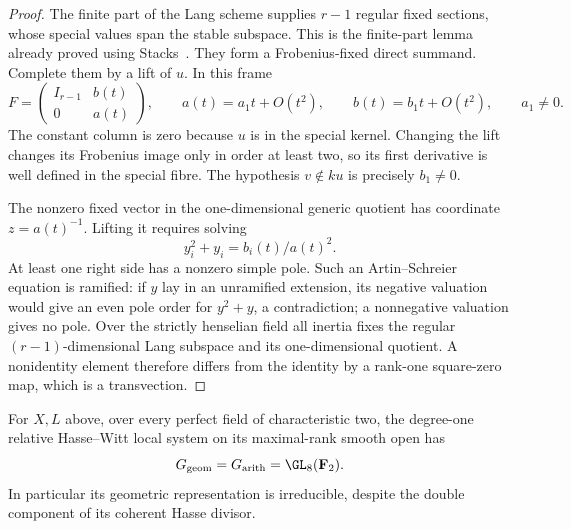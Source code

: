 \begin{proof}
The finite part of the Lang scheme supplies $r-1$ regular fixed
sections, whose special values span the stable subspace. This is the
finite-part lemma already proved using Stacks~\cite{Stacks0BTN,Stacks09ZS}.
They form a Frobenius-fixed direct summand. Complete them by a lift of
$u$. In this frame
\[
 F=\begin{pmatrix}I_{r-1}&b(t)\\0&a(t)\end{pmatrix},
 \qquad a(t)=a_1t+O(t^2),\qquad b(t)=b_1t+O(t^2),\qquad a_1\ne0.
\]
The constant column is zero because $u$ is in the special kernel.
Changing the lift changes its Frobenius image only in order at least
two, so its first derivative is well defined in the special fibre.
The hypothesis $v\notin ku$ is precisely $b_1\ne0$.

The nonzero fixed vector in the one-dimensional generic quotient has
coordinate $z=a(t)^{-1}$. Lifting it requires solving
\[
                  y_i^2+y_i=b_i(t)/a(t)^2.
\]
At least one right side has a nonzero simple pole. Such an
Artin--Schreier equation is ramified: if $y$ lay in an unramified
extension, its negative valuation would give an even pole order
for $y^2+y$, a contradiction; a nonnegative valuation gives no pole.
Over the strictly henselian field all inertia fixes the regular
$(r-1)$-dimensional Lang subspace and its one-dimensional quotient.
A nonidentity element therefore differs from the identity by a rank-one
square-zero map, which is a transvection.
\end{proof}

\begin{theorem}
\label{thm:ss-product-degree-one-full-group}
For $X,L$ above, over every perfect field of characteristic two,
the degree-one relative Hasse--Witt local system on its maximal-rank
smooth open has
\[
                   G_{\rm geom}=G_{\rm arith}=\GL_8(\mathbf F_2).
\]
In particular its geometric representation is irreducible, despite
the double component of its coherent Hasse divisor.
\end{theorem}

